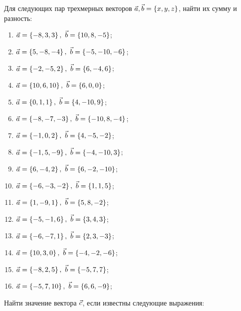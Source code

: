 	\vspace{15pt}
	Для следующих пар трехмерных векторов $\vec{a}, \vec{b} = \left\lbrace x, y, z \right\rbrace$, найти их сумму и разность:

	\begin{enumerate}
		\setcounter{enumi}{\value{tasks}}

		\item \( \displaystyle \vec{a} = \left\lbrace -8, 3, 3 \right\rbrace, ~ \vec{b} = \left\lbrace 10, 8, -5 \right\rbrace \);
		\item \( \displaystyle \vec{a} = \left\lbrace 5, -8, -4 \right\rbrace, ~ \vec{b} = \left\lbrace -5, -10, -6 \right\rbrace \);
		\item \( \displaystyle \vec{a} = \left\lbrace -2, -5, 2 \right\rbrace, ~ \vec{b} = \left\lbrace 6, -4, 6 \right\rbrace \);
		\item \( \displaystyle \vec{a} = \left\lbrace 10, 6, 10 \right\rbrace, ~ \vec{b} = \left\lbrace 6, 0, 0 \right\rbrace \);
		\item \( \displaystyle \vec{a} = \left\lbrace 0, 1, 1 \right\rbrace, ~ \vec{b} = \left\lbrace 4, -10, 9 \right\rbrace \);
		\item \( \displaystyle \vec{a} = \left\lbrace -8, -7, -3 \right\rbrace, ~ \vec{b} = \left\lbrace -10, 8, -4 \right\rbrace \);
		\item \( \displaystyle \vec{a} = \left\lbrace -1, 0, 2 \right\rbrace, ~ \vec{b} = \left\lbrace 4, -5, -2 \right\rbrace \);
		\item \( \displaystyle \vec{a} = \left\lbrace -1, 5, -9 \right\rbrace, ~ \vec{b} = \left\lbrace -4, -10, 3 \right\rbrace \);
		\item \( \displaystyle \vec{a} = \left\lbrace 6, -4, 2 \right\rbrace, ~ \vec{b} = \left\lbrace 6, -2, -10 \right\rbrace \);
		\item \( \displaystyle \vec{a} = \left\lbrace -6, -3, -2 \right\rbrace, ~ \vec{b} = \left\lbrace 1, 1, 5 \right\rbrace \);
		\item \( \displaystyle \vec{a} = \left\lbrace 1, -9, 1 \right\rbrace, ~ \vec{b} = \left\lbrace 5, 8, -2 \right\rbrace \);
		\item \( \displaystyle \vec{a} = \left\lbrace -5, -1, 6 \right\rbrace, ~ \vec{b} = \left\lbrace 3, 4, 3 \right\rbrace \);
		\item \( \displaystyle \vec{a} = \left\lbrace -6, -7, 1 \right\rbrace, ~ \vec{b} = \left\lbrace 2, 3, -3 \right\rbrace \);
		\item \( \displaystyle \vec{a} = \left\lbrace 10, 3, 0 \right\rbrace, ~ \vec{b} = \left\lbrace -4, -2, -6 \right\rbrace \);
		\item \( \displaystyle \vec{a} = \left\lbrace -8, 2, 5 \right\rbrace, ~ \vec{b} = \left\lbrace -5, 7, 7 \right\rbrace \);
		\item \( \displaystyle \vec{a} = \left\lbrace -5, 7, 10 \right\rbrace, ~ \vec{b} = \left\lbrace 6, 6, -9 \right\rbrace \);

		\setcounter{tasks}{\value{enumi}}
	\end{enumerate}

	\vspace{15pt}
	Найти значение вектора $\vec{c}$, если известны следующие выражения:

